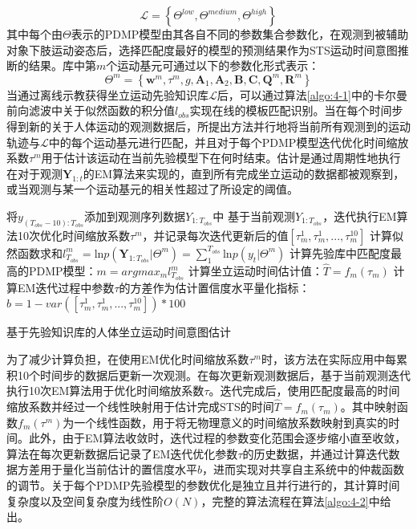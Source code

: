 \begin{equation}
    \mathscr{L}=\left\{\Theta^{low}, \Theta^{medium}, \Theta^{high}\right\}
    \label{eq:4-37}
\end{equation}
其中每个由$\Theta$表示的PDMP模型由其各自不同的参数集合参数化，在观测到被辅助对象下肢运动姿态后，选择匹配度最好的模型的预测结果作为STS运动时间意图推断的结果。库中第$m$个运动基元可通过以下的参数化形式表示：
\begin{equation}
    \Theta ^{m}=\left\{\mathbf{w}^{m}, \tau^{m}, g, \mathbf{A}_1, \mathbf{A}_2, \mathbf{B}, \mathbf{C}, \mathbf{Q}^{m}, \mathbf{R}^{m}\right\}
    \label{eq:4-38}
\end{equation}
当通过离线示教获得坐立运动先验知识库$\mathscr{L}$后，可以通过算法\ref{algo:4-1}中的卡尔曼前向滤波中关于似然函数的积分值$l_{obs}$实现在线的模板匹配识别。当在每个时间步得到新的关于人体运动的观测数据后，所提出方法并行地将当前所有观测到的运动轨迹与$\mathscr{L}$中的每个运动基元进行匹配，并且对于每个PDMP模型迭代优化时间缩放系数$\tau^{m}$用于估计该运动在当前先验模型下在何时结束。估计是通过周期性地执行在对于观测$\mathbf{Y}_{1:t}$的EM算法来实现的，直到所有完成坐立运动的数据都被观察到，或当观测与某一个运动基元的相关性超过了所设定的阈值。
\begin{algorithm}[htb]
    \SetAlgoLined
    {
        将$y_{{(T_{obs}-10)}:T_{obs}}$添加到观测序列数据$Y_{1:T_{obs}}$中 \;
        {
            基于当前观测$Y_{1:T_{obs}}$，迭代执行EM算法10次优化时间缩放系数$\tau^m$，并记录每次迭代更新后的值$[\tau_m^1,\tau_m^1,...,\tau_m^{10}]$\;
            计算似然函数求和$l_{T_{obs}}^m=\text{ln}p(\mathbf{Y}_{1:T_{obs}}|\Theta ^{m})=\sum_{1}^{T_{obs}} \text{ln}p(y_t|\Theta ^{m})$ \;
        }
        计算先验库中匹配度最高的PDMP模型：$m=argmax_m l_{T_{obs}}^m$\;
        计算坐立运动时间估计值：$\hat T = f_m(\tau_m)$\;
        计算EM迭代过程中参数$\tau$的方差作为估计置信度水平量化指标：$b = 1 - var([\tau_m^1,\tau_m^1,...,\tau_m^{10}]) * 100$\;
    }
    \caption{基于先验知识库的人体坐立运动时间意图估计}
    \label{algo:4-2}
\end{algorithm}

为了减少计算负担，在使用EM优化时间缩放系数$\tau^{m}$时，该方法在实际应用中每累积10个时间步的数据后更新一次观测。在每次更新观测数据后，基于当前观测迭代执行10次EM算法用于优化时间缩放系数$\tau$。迭代完成后，使用匹配度最高的时间缩放系数并经过一个线性映射用于估计完成STS的时间$\hat T=f_m(\tau_m)$。其中映射函数$f_m(\tau^m)$为一个线性函数，用于将无物理意义的时间缩放系数映射到真实的时间。此外，由于EM算法收敛时，迭代过程的参数变化范围会逐步缩小直至收敛，算法在每次更新数据后记录了EM迭代优化参数$\tau$的历史数据，并通过计算迭代数据方差用于量化当前估计的置信度水平$b$，进而实现对共享自主系统中的仲裁函数的调节。关于每个PDMP先验模型的参数优化是独立且并行进行的，其计算时间复杂度以及空间复杂度为线性阶$O(N)$，完整的算法流程在算法\ref{algo:4-2}中给出。

